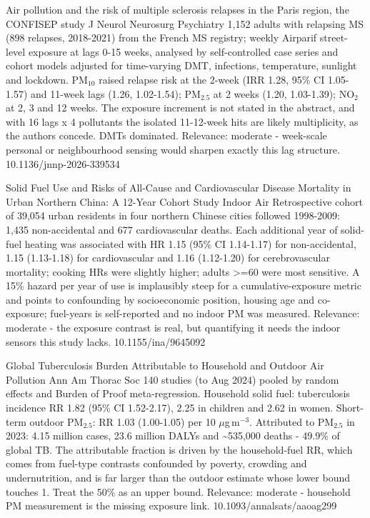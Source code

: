 \documentclass[10pt]{article}
\begin{document}
{Air pollution and the risk of multiple sclerosis relapses in the Paris region, the CONFISEP study}
{J Neurol Neurosurg Psychiatry}
{1,152 adults with relapsing MS (898 relapses, 2018-2021) from the French MS registry; weekly Airparif street-level exposure at lags 0-15 weeks, analysed by self-controlled case series and cohort models adjusted for time-varying DMT, infections, temperature, sunlight and lockdown. PM$_{10}$ raised relapse risk at the 2-week (IRR 1.28, 95\% CI 1.05-1.57) and 11-week lags (1.26, 1.02-1.54); PM$_{2.5}$ at 2 weeks (1.20, 1.03-1.39); NO$_2$ at 2, 3 and 12 weeks. The exposure increment is not stated in the abstract, and with 16 lags x 4 pollutants the isolated 11-12-week hits are likely multiplicity, as the authors concede. DMTs dominated. Relevance: moderate - week-scale personal or neighbourhood sensing would sharpen exactly this lag structure.}
{10.1136/jnnp-2026-339534}

\par{}\baselineskip{}\baselineskip
{}

{Solid Fuel Use and Risks of All-Cause and Cardiovascular Disease Mortality in Urban Northern China: A 12-Year Cohort Study}
{Indoor Air}
{Retrospective cohort of 39,054 urban residents in four northern Chinese cities followed 1998-2009: 1,435 non-accidental and 677 cardiovascular deaths. Each additional year of solid-fuel heating was associated with HR 1.15 (95\% CI 1.14-1.17) for non-accidental, 1.15 (1.13-1.18) for cardiovascular and 1.16 (1.12-1.20) for cerebrovascular mortality; cooking HRs were slightly higher; adults >=60 were most sensitive. A 15\% hazard per year of use is implausibly steep for a cumulative-exposure metric and points to confounding by socioeconomic position, housing age and co-exposure; fuel-years is self-reported and no indoor PM was measured. Relevance: moderate - the exposure contrast is real, but quantifying it needs the indoor sensors this study lacks.}
{10.1155/ina/9645092}

\par{}\baselineskip{}\baselineskip
{}

{Global Tuberculosis Burden Attributable to Household and Outdoor Air Pollution}
{Ann Am Thorac Soc}
{140 studies (to Aug 2024) pooled by random effects and Burden of Proof meta-regression. Household solid fuel: tuberculosis incidence RR 1.82 (95\% CI 1.52-2.17), 2.25 in children and 2.62 in women. Short-term outdoor PM$_{2.5}$: RR 1.03 (1.00-1.05) per 10 $\mu$g\,m$^{-3}$. Attributed to PM$_{2.5}$ in 2023: 4.15 million cases, 23.6 million DALYs and \textasciitilde{}535,000 deaths - 49.9\% of global TB. The attributable fraction is driven by the household-fuel RR, which comes from fuel-type contrasts confounded by poverty, crowding and undernutrition, and is far larger than the outdoor estimate whose lower bound touches 1. Treat the 50\% as an upper bound. Relevance: moderate - household PM measurement is the missing exposure link.}
{10.1093/annalsats/aaoag299}
\end{document}
